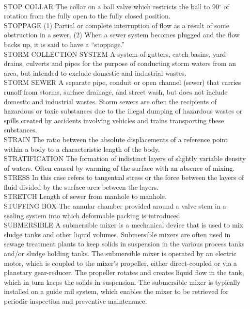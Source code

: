 \vspace{0.3cm}\\
STOP COLLAR
The collar on a ball valve which restricts the ball to 90$^{\circ}$ of rotation from the fully open to the fully closed position.
\vspace{0.3cm}\\
STOPPAGE
(1) Partial or complete interruption of flow as a result of some obstruction in a sewer. (2) When a sewer system becomes plugged and the flow backs up, it is said to have a “stoppage.” 
\vspace{0.3cm}\\
STORM COLLECTION SYSTEM
A system of gutters, catch basins, yard drains, culverts and pipes for the purpose of conducting storm waters from an area, but intended to exclude domestic and industrial wastes. 
\vspace{0.3cm}\\
STORM SEWER
A separate pipe, conduit or open channel (sewer) that carries runoff from storms, surface drainage, and street wash, but does not include domestic and industrial wastes. Storm sewers are often the recipients of hazardous or toxic substances due to the illegal dumping of hazardous wastes or spills created by accidents involving vehicles and trains transporting these substances. 
\vspace{0.3cm}\\
STRAIN
The ratio between the absolute displacements of a reference point within a body to a characteristic length of the body.
\vspace{0.3cm}\\
STRATIFICATION
The formation of indistinct layers of slightly variable density of waters. Often caused by warming of the surface with an absence of mixing.
\vspace{0.3cm}\\
STRESS
In this case refers to tangential stress or the force between the layers of fluid divided by the surface area between the layers.
\vspace{0.3cm}\\
STRETCH
Length of sewer from manhole to manhole.
\vspace{0.3cm}\\
STUFFING BOX
The annular chamber provided around a valve stem in a sealing system into which deformable packing is introduced.
\vspace{0.3cm}\\
SUBMERSIBLE
A submersible mixer is a mechanical device that is used to mix sludge tanks and other liquid volumes. Submersible mixers are often used in sewage treatment plants to keep solids in suspension in the various process tanks and/or sludge holding tanks. The submersible mixer is operated by an electric motor, which is coupled to the mixer’s propeller, either direct-coupled or via a planetary gear-reducer. The propeller rotates and creates liquid flow in the tank, which in turn keeps the solids in suspension. The submersible mixer is typically installed on a guide rail system, which enables the mixer to be retrieved for periodic inspection and preventive maintenance.

